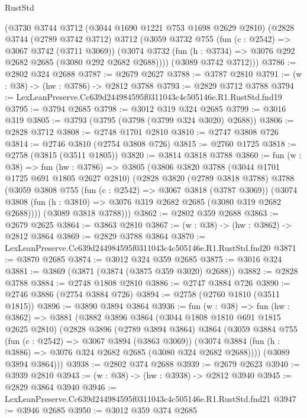 \begin{lexlean}{RustStd}
\begin{coremodule}
    (@3730
      @3744
      @3712
      (@3044 @1690 @1221 @753 @1698 @2629 @2810)
      (@2828
        @3744
        (@2789 @3742 @3712)
        @3712
        (@3059
          @3732
          @755
          (fun (c : @2542) => @3067 @3742 (@3711 @3069))
          (@3074 @3732 (fun (h : @3734) => @3076 @292 @2682 @2685 (@3080 @292 @2682 @2688))))
        (@3089 @3742 @3712)))
@3786 := @2802 @324 @2688
@3787 := @2679 @2627
@3788 := @3787 @2810
@3791 := (w : @38) -> (hw : @3786) -> @2812 @3788
@3793 := @2829 @3712 @3788
@3794 := LexLeanPreserve.Cc639d244984595f0311043c4c505146e.R1.RustStd.fnd19
@3795 := @3794 @2685
@3798 := @3012 @319 @324 @2685
@3799 := @3016 @319
@3805 := @3793 (@3795 (@3798 (@3799 @324 @3020) @2688))
@3806 := @2828 @3712
@3808 := @2748 @1701 @2810
@3810 := @2747 @3808 @726
@3814 := @2746 @3810 (@2754 @3808 @726)
@3815 := @2760 @1725
@3818 := @2758 (@3815 (@3511 @1805))
@3820 := @3814 @3818 @3788
@3860 := fun (w : @38) =>
  fun (hw : @3786) =>
  @3805
    (@3806
      @3820
      @3788
      (@3044 @1701 @1725 @691 @1805 @2627 @2810)
      (@2828
        @3820
        (@2789 @3818 @3788)
        @3788
        (@3059
          @3808
          @755
          (fun (c : @2542) => @3067 @3818 (@3787 @3069))
          (@3074 @3808 (fun (h : @3810) => @3076 @319 @2682 @2685 (@3080 @319 @2682 @2688))))
        (@3089 @3818 @3788)))
@3862 := @2802 @359 @2688
@3863 := @2679 @2625
@3864 := @3863 @2810
@3867 := (w : @38) -> (hw : @3862) -> @2812 @3864
@3869 := @2829 @3788 @3864
@3870 := LexLeanPreserve.Cc639d244984595f0311043c4c505146e.R1.RustStd.fnd20
@3871 := @3870 @2685
@3874 := @3012 @324 @359 @2685
@3875 := @3016 @324
@3881 := @3869 (@3871 (@3874 (@3875 @359 @3020) @2688))
@3882 := @2828 @3788
@3884 := @2748 @1808 @2810
@3886 := @2747 @3884 @726
@3890 := @2746 @3886 (@2754 @3884 @726)
@3894 := @2758 (@2760 @1810 (@3511 @1815))
@3896 := @3890 @3894 @3864
@3936 := fun (w : @38) =>
  fun (hw : @3862) =>
  @3881
    (@3882
      @3896
      @3864
      (@3044 @1808 @1810 @691 @1815 @2625 @2810)
      (@2828
        @3896
        (@2789 @3894 @3864)
        @3864
        (@3059
          @3884
          @755
          (fun (c : @2542) => @3067 @3894 (@3863 @3069))
          (@3074 @3884 (fun (h : @3886) => @3076 @324 @2682 @2685 (@3080 @324 @2682 @2688))))
        (@3089 @3894 @3864)))
@3938 := @2802 @374 @2688
@3939 := @2679 @2623
@3940 := @3939 @2810
@3943 := (w : @38) -> (hw : @3938) -> @2812 @3940
@3945 := @2829 @3864 @3940
@3946 := LexLeanPreserve.Cc639d244984595f0311043c4c505146e.R1.RustStd.fnd21
@3947 := @3946 @2685
@3950 := @3012 @359 @374 @2685

\end{coremodule}
\end{lexlean}
